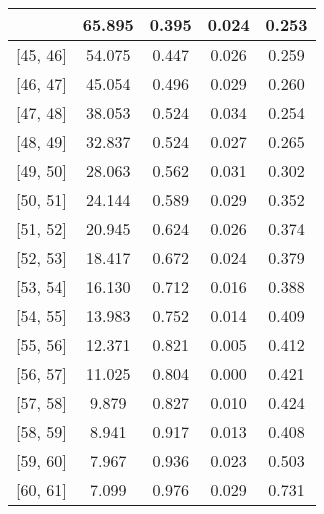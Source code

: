 \documentclass[12pt]{article}
\begin{document}
\begin{table}[]
\begin{tabular}{c|c|c|c|c|}
{\multicolumn{1}{|c|}{{[}44,  45{]}}  & 65.895 & 0.395 & 0.024 & 0.253 \\ \hline 
\multicolumn{1}{|c|}{{[}45,  46{]}}  & 54.075 & 0.447 & 0.026 & 0.259 \\ \hline 
\multicolumn{1}{|c|}{{[}46,  47{]}}  & 45.054 & 0.496 & 0.029 & 0.260 \\ \hline 
\multicolumn{1}{|c|}{{[}47,  48{]}}  & 38.053 & 0.524 & 0.034 & 0.254 \\ \hline 
\multicolumn{1}{|c|}{{[}48,  49{]}}  & 32.837 & 0.524 & 0.027 & 0.265 \\ \hline 
\multicolumn{1}{|c|}{{[}49,  50{]}}  & 28.063 & 0.562 & 0.031 & 0.302 \\ \hline 
\multicolumn{1}{|c|}{{[}50,  51{]}}  & 24.144 & 0.589 & 0.029 & 0.352 \\ \hline 
\multicolumn{1}{|c|}{{[}51,  52{]}}  & 20.945 & 0.624 & 0.026 & 0.374 \\ \hline 
\multicolumn{1}{|c|}{{[}52,  53{]}}  & 18.417 & 0.672 & 0.024 & 0.379 \\ \hline 
\multicolumn{1}{|c|}{{[}53,  54{]}}  & 16.130 & 0.712 & 0.016 & 0.388 \\ \hline 
\multicolumn{1}{|c|}{{[}54,  55{]}}  & 13.983 & 0.752 & 0.014 & 0.409 \\ \hline 
\multicolumn{1}{|c|}{{[}55,  56{]}}  & 12.371 & 0.821 & 0.005 & 0.412 \\ \hline 
\multicolumn{1}{|c|}{{[}56,  57{]}}  & 11.025 & 0.804 & 0.000 & 0.421 \\ \hline 
\multicolumn{1}{|c|}{{[}57,  58{]}}  & 9.879 & 0.827 & 0.010 & 0.424 \\ \hline 
\multicolumn{1}{|c|}{{[}58,  59{]}}  & 8.941 & 0.917 & 0.013 & 0.408 \\ \hline 
\multicolumn{1}{|c|}{{[}59,  60{]}}  & 7.967 & 0.936 & 0.023 & 0.503 \\ \hline 
\multicolumn{1}{|c|}{{[}60,  61{]}}  & 7.099 & 0.976 & 0.029 & 0.731 \\ \hline 
\end{tabular}
\end{table}
\end{document}
